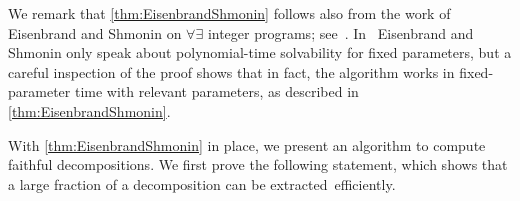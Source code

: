 \documentclass{theoretics}
\begin{document}
We remark that \cref{thm:EisenbrandShmonin} follows also from the work of Eisenbrand and Shmonin on $\forall\exists$ integer programs; see~\cite[Theorem~4.2]{DBLP:journals/mor/EisenbrandS08}. In~\cite{DBLP:journals/mor/EisenbrandS08} Eisenbrand and Shmonin only speak about polynomial-time solvability for fixed parameters, but a careful inspection of the proof shows that in fact, the algorithm works in fixed-parameter time with relevant parameters, as described in \cref{thm:EisenbrandShmonin}.


With \cref{thm:EisenbrandShmonin} in place, we present an algorithm to compute faithful decompositions. We first prove the following statement, which shows that a large fraction of a decomposition can be extracted~efficiently.
\end{document}
